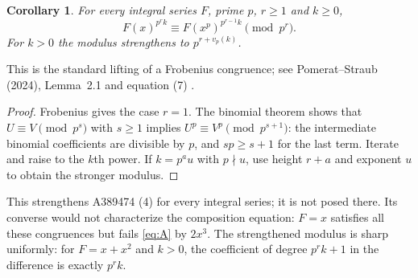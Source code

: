 \documentclass[11pt]{article}
\newtheorem{corollary}[theorem]{Corollary}
\begin{document}
\begin{corollary}\label{cor:powers}
For every integral series $F$, prime $p$, $r\geq1$ and $k\geq0$,
\[
 F(x)^{p^r k}\equiv F(x^p)^{p^{r-1}k}\pmod{p^r}.
\]
For $k>0$ the modulus strengthens to $p^{r+v_p(k)}$.
\end{corollary}
This is the standard lifting of a Frobenius congruence; see
Pomerat--Straub (2024), Lemma~2.1 and equation (7) \cite{ps}.
\begin{proof}
Frobenius gives the case $r=1$. The binomial theorem shows that
$U\equiv V\pmod{p^s}$ with $s\geq1$ implies
$U^p\equiv V^p\pmod{p^{s+1}}$: the intermediate binomial coefficients
are divisible by $p$, and $sp\geq s+1$ for the last term.
Iterate and raise to the $k$th power. If $k=p^a u$ with $p\nmid u$,
use height $r+a$ and exponent $u$ to obtain the stronger modulus.
\end{proof}
This strengthens A389474 (4) for every integral series; it is not posed
there. Its converse would not characterize the composition equation:
$F=x$ satisfies all these congruences but fails \eqref{eq:A} by $2x^3$.
The strengthened modulus is sharp uniformly: for $F=x+x^2$ and $k>0$,
the coefficient of degree $p^rk+1$ in the difference is exactly $p^rk$.
\end{document}
